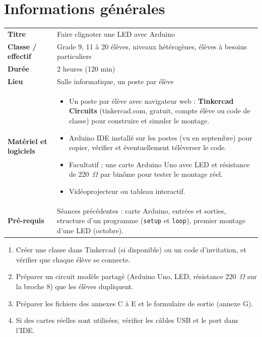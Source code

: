 \documentclass[11pt,a4paper]{article}
\begin{document}

\section{Informations générales}
\begin{tabularx}{\linewidth}{>{\bfseries}p{3.6cm}Y}
\toprule
Titre & Faire clignoter une LED avec Arduino\\
Classe / effectif & Grade 9, 11 à 20 élèves, niveaux hétérogènes, élèves à besoins particuliers\\
Durée & 2 heures (120 min)\\
Lieu & Salle informatique, un poste par élève\\
Matériel et logiciels &
\begin{itemize}
 \item Un poste par élève avec navigateur web : \textbf{Tinkercad Circuits} (tinkercad.com, gratuit, compte élève ou code de classe) pour construire et simuler le montage.
 \item Arduino IDE installé sur les postes (vu en septembre) pour copier, vérifier et éventuellement téléverser le code.
 \item Facultatif : une carte Arduino Uno avec LED et résistance de 220~$\Omega$ par binôme pour tester le montage réel.
 \item Vidéoprojecteur ou tableau interactif.
\end{itemize}\\
Pré-requis &
Séances précédentes : carte Arduino, entrées et sorties, structure d'un programme (\texttt{setup} et \texttt{loop}), premier montage d'une LED (octobre).\\
\bottomrule
\end{tabularx}

\begin{astuce}
\begin{enumerate}
 \item Créer une classe dans Tinkercad (si disponible) ou un code d'invitation, et vérifier que chaque élève se connecte.
 \item Préparer un circuit modèle partagé (Arduino Uno, LED, résistance 220~$\Omega$ sur la broche 8) que les élèves dupliquent.
 \item Préparer les fichiers des annexes C à E et le formulaire de sortie (annexe G).
 \item Si des cartes réelles sont utilisées, vérifier les câbles USB et le port dans l'IDE.
\end{enumerate}
\end{astuce}
\end{document}
